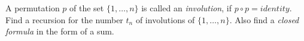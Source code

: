 A permutation $p$ of the set $\{1, \ldots, n\}$ is called an \emph{involution}, if $p \circ p = \textit{identity}$. Find a recursion for the number $t_n$ of involutions of $\{1, \ldots, n\}$. Also find a \emph{closed formula} in the form of a sum.
